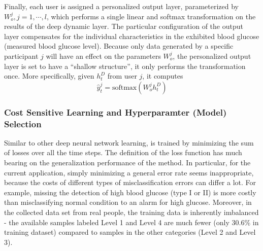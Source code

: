 Finally, each user is assigned a personalized output layer, parameterized by $W_o^j, j=1,\cdots,l$, which performs a single linear and softmax transformation on the results of the deep dynamic layer.
The particular configuration of the output layer compensates for the individual characteristics in the exhibited blood glucose (\ie measured blood glucose level).
Because only data generated by a specific participant $j$ will have an effect on the parameters $W_o^j$, the personalized output layer is set to have a ``shallow structure'', \ie it only performs the transformation once.
More specifically, given $h^D_t$ from user $j$, it computes
\begin{equation}
\hat{y}_t^j = \text{softmax} \left( W_o^j h^D_t \right)
\end{equation}

\subsubsection{Cost Sensitive Learning and Hyperparamter (Model) Selection}
Similar to other deep neural network learning, \modelname is trained by minimizing the sum of losses over all the time steps.
The definition of the loss function has much bearing on the generalization performance of the method.
In particular, for the current application, simply minimizing a general error rate seems inappropriate, because the costs of different types of misclassification errors can differ a lot.
For example, missing the detection of high blood glucose (type I or II) is more costly than misclassifying normal condition to an alarm for high glucose.
Moreover, in the collected data set from real people, the training data is inherently imbalanced - the available samples labeled Level 1 and Level 4 are much fewer (only 30.6\% in training dataset) compared to samples in the other categories (Level 2 and Level 3).


